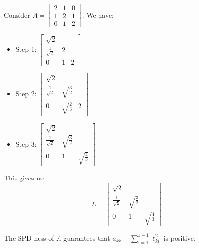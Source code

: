 \documentclass[../main/main.tex]{subfiles}
\begin{document}
    \begin{example}
Consider $A= \begin{bmatrix}
  2&1&0\\
  1&2&1\\
  0&1&2
\end{bmatrix}$. We have:
\begin{itemize}
\item Step 1: $\begin{bmatrix}
  \sqrt{2}&&\\
  \frac{1}{\sqrt{2}}&2&\\
  0&1&2
\end{bmatrix}$
\item Step 2: $\begin{bmatrix}
  \sqrt{2}&&\\
  \frac{1}{\sqrt{2}}&\sqrt{\frac{3}{2}}&\\
  0&\sqrt{\frac{2}{3}}&2
\end{bmatrix}$
\item Step 3: $\begin{bmatrix}
  \sqrt{2}&&\\
  \frac{1}{\sqrt{2}}&\sqrt{\frac{3}{2}}&\\
  0&1&\sqrt{\frac{4}{3}}
\end{bmatrix}$
\end{itemize}
This gives us: \[
  L = \begin{bmatrix}
  \sqrt{2}&&\\
  \frac{1}{\sqrt{2}}&\sqrt{\frac{3}{2}}&\\
  0&1&\sqrt{\frac{4}{3}}
\end{bmatrix}
\]
    \end{example}

\begin{remark}
  The SPD-ness of $A$ guarantees that $a_{k k} - \sum_{i=1}^{k-1} \ell_{k i} ^2$ is positive.
\end{remark}
\end{document}
